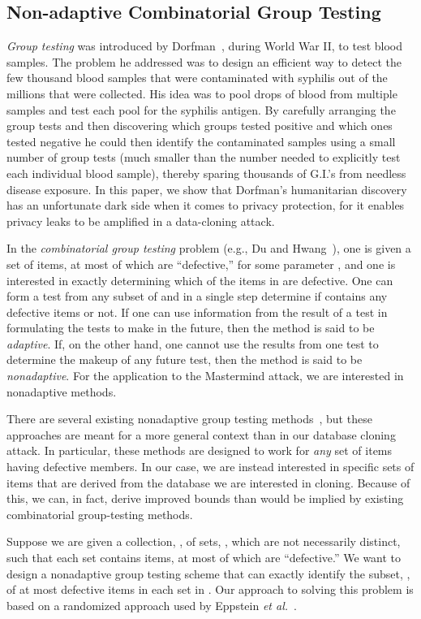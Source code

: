 \documentclass{article}
\begin{document}
\subsection{Non-adaptive Combinatorial Group Testing}
\emph{Group testing} 
was introduced by Dorfman~\cite{d-ddmlp-43}, during World War II,
to test blood samples.
The problem he addressed was to design an efficient way to detect the
few thousand blood samples that were contaminated with syphilis out
of the millions that were collected.
His idea was to pool drops of blood from multiple samples and test
each pool for the syphilis antigen. By carefully arranging the
group tests and then discovering which groups
tested positive and which ones tested negative 
he could then identify the contaminated
samples using a small number of group tests (much
smaller than the number needed to explicitly test each individual blood sample),
thereby sparing thousands of G.I.'s from needless disease exposure.
In this paper, we show that Dorfman's humanitarian discovery has an
unfortunate dark side when it comes to privacy protection, 
for it enables privacy leaks to be amplified in a data-cloning attack.

In the \emph{combinatorial group testing} problem
(e.g., Du and Hwang~\cite{dh-cgtia-00}), one is given a set  of
 items, at most  of which are ``defective,''
for some parameter , and one is interested in
exactly determining which of the items in  are defective.
One can form a test from any subset  of  and in a single step
determine if  contains any defective items or not.
If one can use information from the result of a test in formulating
the tests to make in the future, then the method is said to be
\emph{adaptive}. If, on the other hand, one cannot use the results
from one test to determine the makeup of any future test, then the
method is said to be \emph{nonadaptive}.
For the application to the Mastermind attack, we are interested in
nonadaptive methods.

There are several existing nonadaptive group testing methods~\cite{dh-cgtia-00}, 
but these approaches are meant for a more general context than 
in our database cloning attack.
In particular, these methods are designed to work for \emph{any} set
of items having  defective members.
In our case, we are instead interested in specific sets of items that
are derived from the database we are interested in cloning.
Because of this, we can, in fact, derive improved bounds than would
be implied by existing combinatorial group-testing methods.

Suppose we are given a collection, ,
of sets, 
,
which are not necessarily distinct, such that each set 
contains  items, at most  of which are ``defective.''
We want to design a nonadaptive group testing scheme that can
exactly identify the subset, , of
at most  defective items in each set  in .
Our approach to solving this problem
is based on a 
randomized approach used by Eppstein {\it et al.}~\cite{egh-icgtr-05}.
\end{document}
